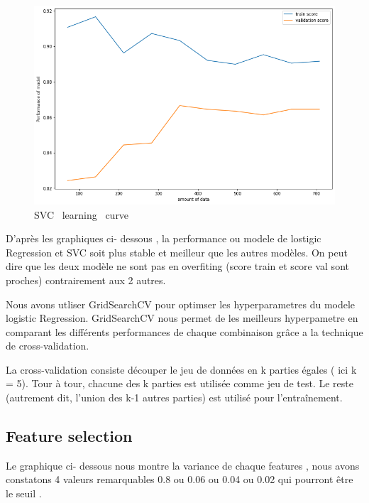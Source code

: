 \documentclass[12pt]{article}
\begin{document}
\begin{figure}[H]
\begin{center}
\includegraphics[scale=0.6]{learning_curve_4.png} 
\caption[]{ SVC \ learning \ curve }
\end{center}
\end{figure}



D'après les graphiques ci- dessous , la performance ou modele de lostigic Regression et SVC soit plus stable et meilleur que les autres modèles. On peut dire que les deux modèle ne sont pas en overfiting
(score train et score val sont proches) contrairement aux 2 autres.


Nous avons utliser  GridSearchCV pour optimser les hyperparametres du modele  logistic Regression. 
GridSearchCV nous permet de les meilleurs hyperpametre en comparant les différents performances 
 de chaque combinaison grâce a la technique de cross-validation.

La cross-validation consiste découper le jeu de données en k parties égales  ( ici k = 5). Tour à tour, chacune des k parties est utilisée comme jeu de test. Le reste (autrement dit, l’union des k-1 autres parties) est utilisé pour l'entraînement.

  
  
\subsection{Feature selection} 


Le graphique ci- dessous nous montre la variance de chaque features , nous avons constatons 4 valeurs 
remarquables 0.8 ou 0.06 ou 0.04 ou 0.02 qui pourront être le seuil .
\end{document}
